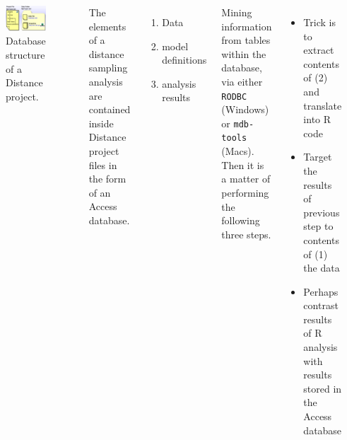 \documentclass[14pt,a1paper,landscape]{tikzposter}
\begin{document}
\begin{columns}
{\begin{figure}
	\begin{tikzfigure}
		\includegraphics[width=.85\linewidth]{dst-file-structure.PNG}
	\end{tikzfigure}
	\caption{Database structure of a Distance project.}
\end{figure}

The elements of a distance sampling analysis are contained inside Distance project files in the form of an Access database.

\begin{enumerate}
	\item Data
	\item model definitions
	\item analysis results
\end{enumerate}

Mining information from tables within the database, via either \texttt{RODBC} (Windows) or \texttt{mdb-tools} (Macs).  Then it is a matter of performing the following three steps.

\begin{itemize}
	\item Trick is to extract contents of (2) and translate into R code
	\item Target the results of previous step to contents of (1) the data
	\item Perhaps contrast results of R analysis with results stored in the Access database
\end{itemize}

}



\end{columns}
\end{document}
